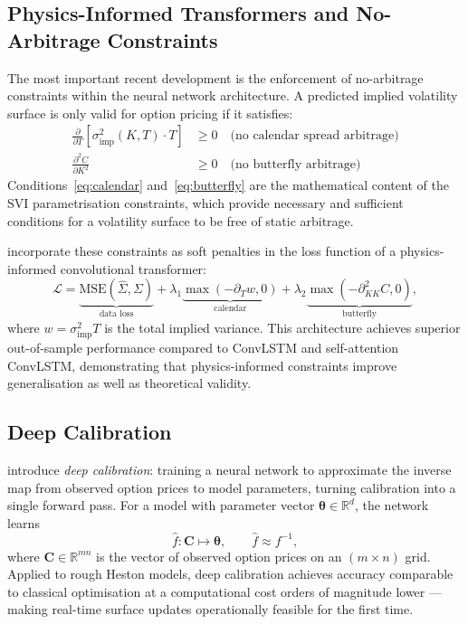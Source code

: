 \documentclass[12pt, a4paper]{article}
\begin{document}
\subsection{Physics-Informed Transformers and No-Arbitrage Constraints}

The most important recent development is the enforcement of no-arbitrage
constraints within the neural network architecture. A predicted implied
volatility surface is only valid for option pricing if it satisfies:
\begin{align}
  \frac{\partial}{\partial T}\left[\sigma_{\mathrm{imp}}^2(K,T)\cdot T\right]
  &\geq 0
  \quad \text{(no calendar spread arbitrage)}
  \label{eq:calendar}\\
  \frac{\partial^2 C}{\partial K^2} &\geq 0
  \quad \text{(no butterfly arbitrage)}
  \label{eq:butterfly}
\end{align}
Conditions~\eqref{eq:calendar} and~\eqref{eq:butterfly} are the
mathematical content of the \citet{gatheral2014ssvi} SVI
parametrisation constraints, which provide necessary and sufficient
conditions for a volatility surface to be free of static arbitrage.

\citet{kim2022} incorporate these constraints as soft penalties in the
loss function of a physics-informed convolutional transformer:
\begin{equation}
  \mathcal{L} = \underbrace{\mathrm{MSE}(\hat{\Sigma}, \Sigma)}_{\text{data loss}}
  + \lambda_1 \underbrace{\max\!\left(-\partial_T w, 0\right)}_{\text{calendar}}
  + \lambda_2 \underbrace{\max\!\left(-\partial_{KK}^2 C, 0\right)}_{\text{butterfly}},
  \label{eq:physics_loss}
\end{equation}
where $w = \sigma_{\mathrm{imp}}^2 T$ is the total implied variance.
This architecture achieves superior out-of-sample performance compared
to ConvLSTM and self-attention ConvLSTM, demonstrating that
physics-informed constraints improve generalisation as well as
theoretical validity.

\subsection{Deep Calibration}

\citet{bayer2019} introduce \emph{deep calibration}: training a neural
network to approximate the inverse map from observed option prices to
model parameters, turning calibration into a single forward pass.
For a model with parameter vector $\boldsymbol{\theta} \in \mathbb{R}^d$,
the network learns
\begin{equation}
  \hat{f}: \mathbf{C} \mapsto \boldsymbol{\theta},
  \qquad \hat{f} \approx f^{-1},
  \label{eq:deep_calib}
\end{equation}
where $\mathbf{C} \in \mathbb{R}^{mn}$ is the vector of observed option
prices on an $(m \times n)$ grid. Applied to rough Heston models, deep
calibration achieves accuracy comparable to classical optimisation
at a computational cost orders of magnitude lower --- making real-time
surface updates operationally feasible for the first time.
\end{document}
